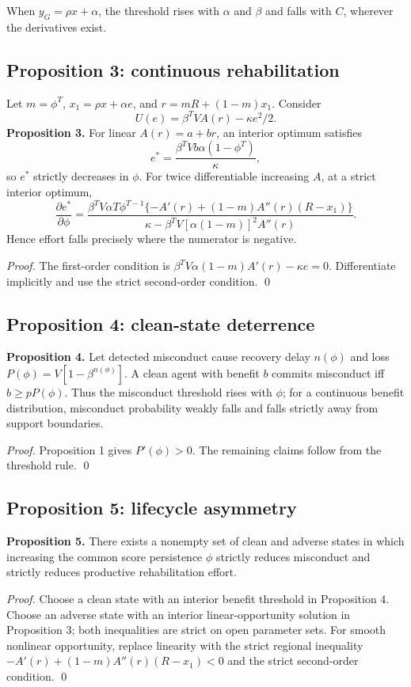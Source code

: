 When $y_G=\rho x+\alpha$, the threshold rises with $\alpha$ and $\beta$ and falls with $C$, wherever the derivatives exist.

\subsection{Proposition 3: continuous rehabilitation}
Let $m=\phi^T$, $x_1=\rho x+\alpha e$, and $r=mR+(1-m)x_1$. Consider
\[
U(e)=\beta^T V A(r)-\kappa e^2/2.
\]
\textbf{Proposition 3.} For linear $A(r)=a+br$, an interior optimum satisfies
\[
e^*=\frac{\beta^T Vb\alpha(1-\phi^T)}{\kappa},
\]
so $e^*$ strictly decreases in $\phi$. For twice differentiable increasing $A$, at a strict interior optimum,
\[
\frac{\partial e^*}{\partial\phi}=
\frac{\beta^T V\alpha T\phi^{T-1}\{-A'(r)+(1-m)A''(r)(R-x_1)\}}
{\kappa-\beta^T V[\alpha(1-m)]^2A''(r)}.
\]
Hence effort falls precisely where the numerator is negative.

\textit{Proof.} The first-order condition is $\beta^TV\alpha(1-m)A'(r)-\kappa e=0$. Differentiate implicitly and use the strict second-order condition. \qed

\subsection{Proposition 4: clean-state deterrence}
\textbf{Proposition 4.} Let detected misconduct cause recovery delay $n(\phi)$ and loss $P(\phi)=V[1-\beta^{n(\phi)}]$. A clean agent with benefit $b$ commits misconduct iff $b\ge pP(\phi)$. Thus the misconduct threshold rises with $\phi$; for a continuous benefit distribution, misconduct probability weakly falls and falls strictly away from support boundaries.

\textit{Proof.} Proposition 1 gives $P'(\phi)>0$. The remaining claims follow from the threshold rule. \qed

\subsection{Proposition 5: lifecycle asymmetry}
\textbf{Proposition 5.} There exists a nonempty set of clean and adverse states in which increasing the common score persistence $\phi$ strictly reduces misconduct and strictly reduces productive rehabilitation effort.

\textit{Proof.} Choose a clean state with an interior benefit threshold in Proposition 4. Choose an adverse state with an interior linear-opportunity solution in Proposition 3; both inequalities are strict on open parameter sets. For smooth nonlinear opportunity, replace linearity with the strict regional inequality $-A'(r)+(1-m)A''(r)(R-x_1)<0$ and the strict second-order condition. \qed

